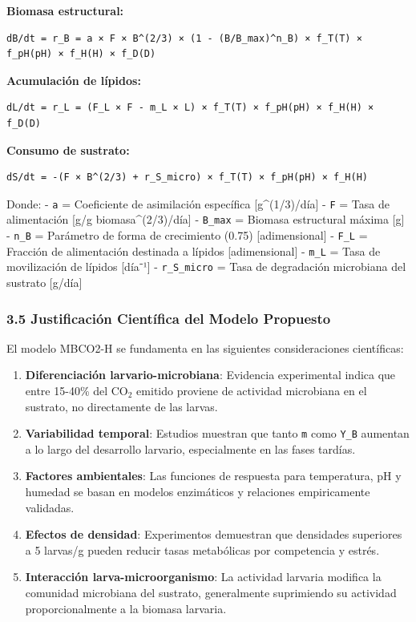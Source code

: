 \documentclass[
]{article}
\begin{document}
\textbf{Biomasa estructural:}

\begin{verbatim}
dB/dt = r_B = a × F × B^(2/3) × (1 - (B/B_max)^n_B) × f_T(T) × f_pH(pH) × f_H(H) × f_D(D)
\end{verbatim}

\textbf{Acumulación de lípidos:}

\begin{verbatim}
dL/dt = r_L = (F_L × F - m_L × L) × f_T(T) × f_pH(pH) × f_H(H) × f_D(D)
\end{verbatim}

\textbf{Consumo de sustrato:}

\begin{verbatim}
dS/dt = -(F × B^(2/3) + r_S_micro) × f_T(T) × f_pH(pH) × f_H(H)
\end{verbatim}

Donde: - \texttt{a} = Coeficiente de asimilación específica
{[}g\^{}(1/3)/día{]} - \texttt{F} = Tasa de alimentación {[}g/g
biomasa\^{}(2/3)/día{]} - \texttt{B\_max} = Biomasa estructural máxima
{[}g{]} - \texttt{n\_B} = Parámetro de forma de crecimiento (0.75)
{[}adimensional{]} - \texttt{F\_L} = Fracción de alimentación destinada
a lípidos {[}adimensional{]} - \texttt{m\_L} = Tasa de movilización de
lípidos {[}día⁻¹{]} - \texttt{r\_S\_micro} = Tasa de degradación
microbiana del sustrato {[}g/día{]}

\subsubsection{3.5 Justificación Científica del Modelo
Propuesto}\label{justificaciuxf3n-cientuxedfica-del-modelo-propuesto}

El modelo MBCO2-H se fundamenta en las siguientes consideraciones
científicas:

\begin{enumerate}
\def\labelenumi{\arabic{enumi}.}
\item
  \textbf{Diferenciación larvario-microbiana}: Evidencia experimental
  indica que entre 15-40\% del CO$_2$ emitido proviene de actividad
  microbiana en el sustrato, no directamente de las larvas.
\item
  \textbf{Variabilidad temporal}: Estudios muestran que tanto \texttt{m}
  como \texttt{Y\_B} aumentan a lo largo del desarrollo larvario,
  especialmente en las fases tardías.
\item
  \textbf{Factores ambientales}: Las funciones de respuesta para
  temperatura, pH y humedad se basan en modelos enzimáticos y relaciones
  empiricamente validadas.
\item
  \textbf{Efectos de densidad}: Experimentos demuestran que densidades
  superiores a 5 larvas/g pueden reducir tasas metabólicas por
  competencia y estrés.
\item
  \textbf{Interacción larva-microorganismo}: La actividad larvaria
  modifica la comunidad microbiana del sustrato, generalmente
  suprimiendo su actividad proporcionalmente a la biomasa larvaria.
\end{enumerate}
\end{document}
